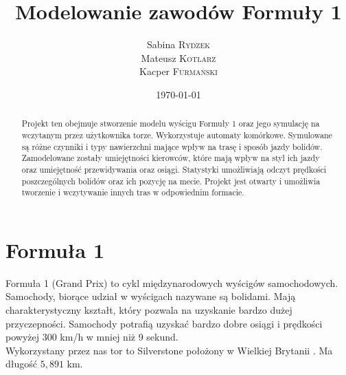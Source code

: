 \documentclass{article}
\title{Modelowanie zawodów Formuły 1} %
\author{Sabina \textsc{Rydzek} \\ Mateusz \textsc{Kotlarz} \\ Kacper \textsc{Furmański}} %
\date{\today} %
\begin{document}
\maketitle %


\begin{abstract}
Projekt ten obejmuje stworzenie modelu wyścigu Formuły 1 oraz jego symulację na wczytanym przez użytkownika torze. Wykorzystuje automaty komórkowe. Symulowane są różne czynniki i typy nawierzchni mające wpływ na trasę i sposób jazdy bolidów. Zamodelowane zostały umiejętności kierowców, które mają wpływ na styl ich jazdy oraz umiejętność przewidywania oraz osiągi. Statystyki umożliwiają odczyt prędkości poszczególnych bolidów oraz ich pozycję na mecie. Projekt jest otwarty i umożliwia tworzenie i wczytywanie innych tras w odpowiednim formacie.
\end{abstract}

\pagebreak


\section{Formuła 1}
Formuła 1 (Grand Prix) to cykl międzynarodowych wyścigów samochodowych. Samochody, biorące udział w wyścigach nazywane są bolidami. Mają charakterystyczny kształt, który pozwala na uzyskanie bardzo dużej przyczepności. Samochody potrafią uzyskać bardzo dobre osiągi i prędkości powyżej $300$ km/h w mniej niż 9 sekund. \\

Wykorzystany przez nas tor to Silverstone położony w Wielkiej Brytanii \cite{track}. Ma długość $5,891$ km.
\end{document}
